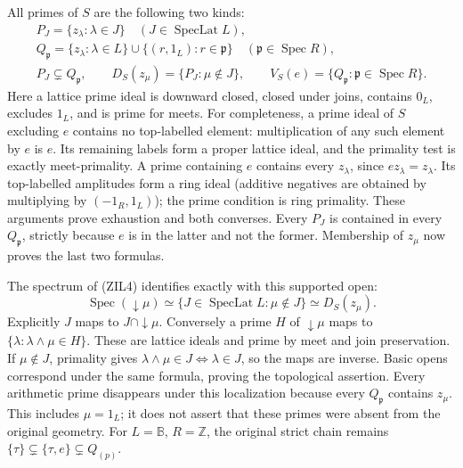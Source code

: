All primes of $S$ are the following two kinds:
\begin{equation}\tag{ZIL9}
\begin{gathered}
 P_J=\{z_\lambda:\lambda\in J\}
       \quad(J\in\operatorname{SpecLat}L),\\
 Q_{\mathfrak p}=\{z_\lambda:\lambda\in L\}
       \cup\{(r,1_L):r\in\mathfrak p\}
       \quad(\mathfrak p\in\operatorname{Spec}R),\\
 P_J\subsetneq Q_{\mathfrak p},\qquad
 D_S(z_\mu)=\{P_J:\mu\notin J\},\qquad
 V_S(e)=\{Q_{\mathfrak p}:\mathfrak p\in\operatorname{Spec}R\}.
\end{gathered}
\end{equation}
Here a lattice prime ideal is downward closed, closed under joins,
contains $0_L$, excludes $1_L$, and is prime for meets.
For completeness, a prime ideal of $S$ excluding $e$ contains no
top-labelled element: multiplication of any such element by $e$
is $e$. Its remaining labels form a proper lattice ideal, and
the primality test is exactly meet-primality. A prime containing
$e$ contains every $z_\lambda$, since $e z_\lambda=z_\lambda$.
Its top-labelled amplitudes form a ring ideal (additive negatives
are obtained by multiplying by $(-1_R,1_L)$); the prime condition
is ring primality. These arguments prove exhaustion and both
converses. Every $P_J$ is contained in every $Q_{\mathfrak p}$,
strictly because $e$ is in the latter and not the former.
Membership of $z_\mu$ now proves the last two formulas.

The spectrum of (ZIL4) identifies exactly with this supported open:
\begin{equation}\tag{ZIL10}
 \operatorname{Spec}(\downarrow\mu)
   \simeq\{J\in\operatorname{SpecLat}L:\mu\notin J\}
   \simeq D_S(z_\mu).
\end{equation}
Explicitly $J$ maps to $J\cap\downarrow\mu$. Conversely a prime
$H$ of $\downarrow\mu$ maps to
$\{\lambda:\lambda\wedge\mu\in H\}$.
These are lattice ideals and prime by meet and join preservation.
If $\mu\notin J$, primality gives
$\lambda\wedge\mu\in J\Longleftrightarrow\lambda\in J$,
so the maps are inverse. Basic opens correspond under the same
formula, proving the topological assertion.
Every arithmetic prime disappears under this localization because
every $Q_{\mathfrak p}$ contains $z_\mu$. This includes $\mu=1_L$;
it does not assert that these primes were absent from the original
geometry. For $L=\mathbb B$, $R=\mathbb Z$, the original strict
chain remains $\{\tau\}\subsetneq\{\tau,e\}\subsetneq Q_{(p)}$.

